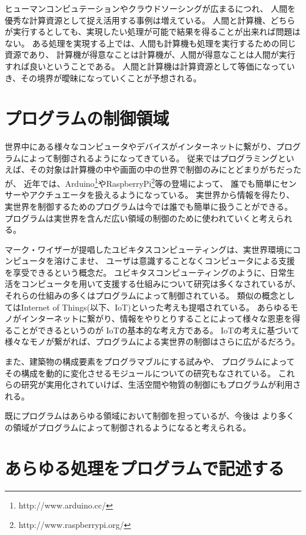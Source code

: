 ヒューマンコンピュテーションやクラウドソーシングが広まるにつれ、
人間を優秀な計算資源として捉え活用する事例は増えている。
人間と計算機、どちらが実行するとしても、実現したい処理が可能で結果を得ることが出来れば問題はない。
ある処理を実現する上では、人間も計算機も処理を実行するための同じ資源であり、
計算機が得意なことは計算機が、人間が得意なことは人間が実行すれば良いということである。
人間と計算機は計算資源として等価になっていき、その境界が曖昧になっていくことが予想される。

\section{プログラムの制御領域}\label{sec:are-of-program}

世界中にある様々なコンピュータやデバイスがインターネットに繋がり、プログラムによって制御されるようになってきている。
従来ではプログラミングといえば、その対象は計算機の中や画面の中の世界で制御のみにとどまりがちだったが、
近年では、Arduino\footnote{http://www.arduino.cc/}やRaspberryPi\footnote{http://www.raspberrypi.org/}等の登場によって、
誰でも簡単にセンサーやアクチュエータを扱えるようになっている。
実世界から情報を得たり、実世界を制御するためのプログラムは今では誰でも簡単に扱うことができる。
プログラムは実世界を含んだ広い領域の制御のために使われていくと考えられる。

マーク・ワイザーが提唱したユビキタスコンピューティング\cite{weiser1991computer}は、実世界環境にコンピュータを溶けこませ、
ユーザは意識することなくコンピュータによる支援を享受できるという概念だ。
ユビキタスコンピューティングのように、日常生活をコンピュータを用いて支援する仕組みについて研究は多くなされているが、
それらの仕組みの多くはプログラムによって制御されている。
類似の概念としてはInternet of
Things(以下、IoT)\cite{iot}といった考えも提唱されている。
あらゆるモノがインターネットに繋がり、情報をやりとりすることによって様々な恩恵を得ることができるというのが
IoTの基本的な考え方である。
IoTの考えに基づいて様々なモノが繋がれば、プログラムによる実世界の制御はさらに広がるだろう。

また、建築物の構成要素をプログラマブルにする試み\cite{squama}や、
プログラムによってその構成を動的に変化させるモジュールについての研究もなされている。
これらの研究が実用化されていけば、生活空間や物質の制御にもプログラムが利用される。

既にプログラムはあらゆる領域において制御を担っているが、今後は
より多くの領域がプログラムによって制御されるようになると考えられる。

\section{あらゆる処理をプログラムで記述する}\label{ux3042ux3089ux3086ux308bux51e6ux7406ux3092ux30d7ux30edux30b0ux30e9ux30e0ux3067ux8a18ux8ff0ux3059ux308b}

